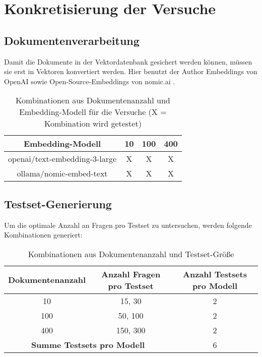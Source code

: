 \section{Konkretisierung der Versuche}

\subsection{Dokumentenverarbeitung}

Damit die Dokumente in der Vektordatenbank gesichert werden können, müssen sie erst in Vektoren konvertiert werden. Hier benutzt der Author Embeddings von OpenAI sowie Open-Source-Embeddings von nomic.ai \cite{nomic_embed_text_v1_blog}.

\begin{table}[htbp]
    \centering
    \begin{tabular}{|c|c|c|c|}
        \hline
        \textbf{Embedding-Modell} & \textbf{10} & \textbf{100} & \textbf{400} \\
        \hline
        openai/text-embedding-3-large & X & X & X \\
        ollama/nomic-embed-text       & X & X & X \\
        \hline
    \end{tabular}
    \caption{Kombinationen aus Dokumentenanzahl und Embedding-Modell für die Versuche (X = Kombination wird getestet)}
    \label{tab:dokument-erstellung}
\end{table}

\subsection{Testset-Generierung}

Um die optimale Anzahl an Fragen pro Testset zu untersuchen, werden folgende Kombinationen generiert:

\begin{table}[htbp]
    \centering
    \begin{tabular}{|c|c|c|}
        \hline
        \textbf{Dokumentenanzahl} & \textbf{Anzahl Fragen pro Testset} & \textbf{Anzahl Testsets pro Modell} \\
        \hline
        10   & 15, 30    & 2 \\
        100  & 50, 100   & 2 \\
        400 & 150, 300  & 2 \\
        \hline
        \multicolumn{2}{|c|}{\textbf{Summe Testsets pro Modell}} & 6 \\
        \hline
    \end{tabular}
    \caption{Kombinationen aus Dokumentenanzahl und Testset-Größe}
\end{table}

